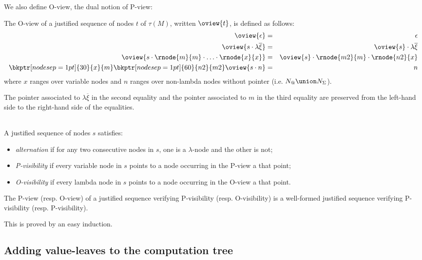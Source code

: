 We also define O-view, the dual notion of P-view:
\begin{dfn}
The O-view of a justified sequence of nodes $t$ of $\tau(M)$, written $\oview{t}$, is defined as follows:
\begin{eqnarray*}
 \oview{\epsilon} &=&  \epsilon \\
 \oview{s \cdot \lambda \overline{\xi} }  &=&  \oview{s} \cdot \lambda \overline{\xi} \\
 \oview{s \cdot \rnode{m}{m} \cdot \ldots \cdot \rnode{x}{x}} &=& \oview{s} \cdot \rnode{m2}{m} \cdot \rnode{n2}{x} \\
   \bkptr[nodesep=1pt]{30}{x}{m}
   \bkptr[nodesep=1pt]{60}{n2}{m2}
 \oview{s \cdot n }  &=&  n
\end{eqnarray*}
where $x$ ranges over variable nodes and  $n$ ranges over non-lambda
nodes without pointer (i.e. $N_@ \union N_\Sigma$).

The pointer associated to $\lambda \overline{\xi}$ in the second
equality and the pointer associated to $m$ in the third equality are
preserved from the left-hand side to the right-hand side of the
equalities.
\end{dfn}

\begin{dfn} \ \\
A justified sequence of nodes $s$ satisfies:
\begin{itemize}
\item \emph{alternation} if for any two consecutive nodes in $s$, one is a $\lambda$-node
and the other is not;

\item \emph{P-visibility} if every variable node in $s$ points to a node occurring in the P-view a that point;

\item  \emph{O-visibility} if every lambda node in $s$ points to a node occurring in the O-view a that point.
\end{itemize}
\end{dfn}

\begin{property}
\label{proper:pview_visibility}
The P-view (resp. O-view) of a justified sequence verifying P-visibility (resp. O-visibility)
is a well-formed justified sequence verifying P-visibility (resp. P-visibility).
\end{property}
This is proved by an easy induction.

\subsection{Adding value-leaves to the computation tree}
\label{sec:adding_value_leaves}

